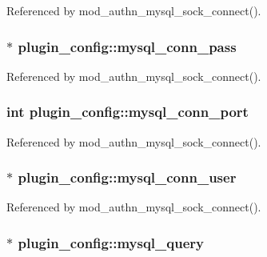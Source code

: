 Referenced by mod\-\_\-authn\-\_\-mysql\-\_\-sock\-\_\-connect().

\hypertarget{structplugin__config_a5d14d694b2e06adf104ba0bdd6f33c5b}{
\subsubsection[{mysql\-\_\-conn\-\_\-pass}]{$\ast$ plugin\-\_\-config\-::mysql\-\_\-conn\-\_\-pass}}\label{structplugin__config_a5d14d694b2e06adf104ba0bdd6f33c5b}


Referenced by mod\-\_\-authn\-\_\-mysql\-\_\-sock\-\_\-connect().

\hypertarget{structplugin__config_a8c0053d52a26b46b3db5a01351917b6e}{
\subsubsection[{mysql\-\_\-conn\-\_\-port}]{\setlength{\rightskip}{0pt plus 5cm}int plugin\-\_\-config\-::mysql\-\_\-conn\-\_\-port}}\label{structplugin__config_a8c0053d52a26b46b3db5a01351917b6e}


Referenced by mod\-\_\-authn\-\_\-mysql\-\_\-sock\-\_\-connect().

\hypertarget{structplugin__config_a940cddc3f8dda1c9c126df2ff02b6daf}{
\subsubsection[{mysql\-\_\-conn\-\_\-user}]{$\ast$ plugin\-\_\-config\-::mysql\-\_\-conn\-\_\-user}}\label{structplugin__config_a940cddc3f8dda1c9c126df2ff02b6daf}


Referenced by mod\-\_\-authn\-\_\-mysql\-\_\-sock\-\_\-connect().

\hypertarget{structplugin__config_a97944e8cd55b460bbe91f0d0a6e02617}{
\subsubsection[{mysql\-\_\-query}]{$\ast$ plugin\-\_\-config\-::mysql\-\_\-query}}\label{structplugin__config_a97944e8cd55b460bbe91f0d0a6e02617}



